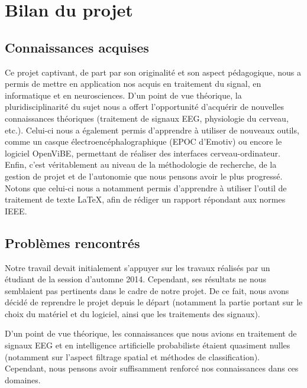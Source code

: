 \chapter{Bilan du projet}
\thispagestyle{fancy}

\section {Connaissances acquises}

Ce projet captivant, de part par son originalité et son aspect pédagogique, nous a permis de mettre en application nos acquis en traitement du signal, en informatique et en neurosciences. D'un point de vue théorique, la pluridisciplinarité du sujet nous a offert l'opportunité d'acquérir de nouvelles connaissances théoriques (traitement de signaux EEG, physiologie du cerveau, etc.). Celui-ci nous a également permis d'apprendre à utiliser de nouveaux outils, comme un casque électroencéphalographique (EPOC d'Emotiv) ou encore le logiciel OpenViBE, permettant de réaliser des interfaces cerveau-ordinateur. Enfin, c'est véritablement au niveau de la méthodologie de recherche, de la gestion de projet et de l'autonomie que nous pensons avoir le plus progressé. Notons que celui-ci nous a notamment permis d'apprendre à utiliser l'outil de traitement de texte \LaTeX, afin de rédiger un rapport répondant aux normes IEEE.

\section {Problèmes rencontrés}

Notre travail devait initialement s'appuyer sur les travaux réalisés par un étudiant de la session d'automne 2014. Cependant, ses résultats ne nous semblaient pas pertinents dans le cadre de notre projet. De ce fait, nous avons décidé de reprendre le projet depuis le départ (notamment la partie portant sur le choix du matériel et du logiciel, ainsi que les traitements des signaux).

D'un point de vue théorique, les connaissances que nous avions en traitement de signaux EEG et en intelligence artificielle probabiliste étaient quasiment nulles (notamment sur l'aspect filtrage spatial et méthodes de classification). Cependant, nous pensons avoir suffisamment renforcé nos connaissances dans ces domaines.


